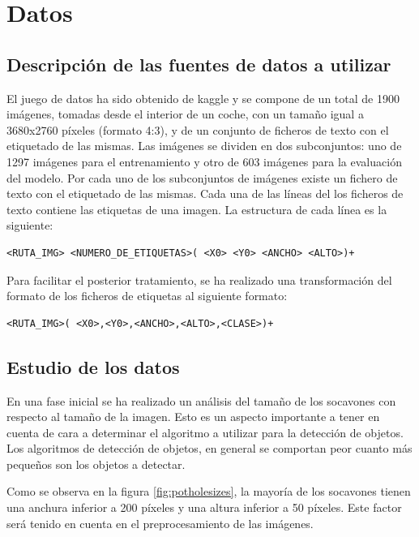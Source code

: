 \section{Datos}

\subsection{Descripción de las fuentes de datos a utilizar}

El juego de datos ha sido obtenido de kaggle \cite{potholedataset} y se compone de un total de 1900 imágenes, tomadas desde el interior de un coche, con un tamaño igual a 3680x2760 píxeles (formato 4:3), y de un conjunto de ficheros de texto con el etiquetado de las mismas. Las imágenes se dividen en dos subconjuntos: uno de 1297 imágenes para el entrenamiento y otro de 603 imágenes para la evaluación del modelo. Por cada uno de los subconjuntos de imágenes existe un fichero de texto con el etiquetado de las mismas. Cada una de las líneas del los ficheros de texto contiene las etiquetas de una imagen. La estructura de cada línea es la siguiente:

\begin{lstlisting}[frame=single,basicstyle=\ttfamily\footnotesize]
<RUTA_IMG> <NUMERO_DE_ETIQUETAS>( <X0> <Y0> <ANCHO> <ALTO>)+
\end{lstlisting}

Para facilitar el posterior tratamiento, se ha realizado una transformación del formato de los ficheros de etiquetas al siguiente formato:

\begin{lstlisting}[frame=single,basicstyle=\ttfamily\footnotesize]
<RUTA_IMG>( <X0>,<Y0>,<ANCHO>,<ALTO>,<CLASE>)+
\end{lstlisting}

\subsection{Estudio de los datos}

En una fase inicial se ha realizado un análisis del tamaño de los socavones con respecto al tamaño de la imagen. Esto es un aspecto importante a tener en cuenta de cara a determinar el algoritmo a utilizar para la detección de objetos. Los algoritmos de detección de objetos, en general se comportan peor cuanto más pequeños son los objetos a detectar.

Como se observa en la figura \ref{fig:potholesizes}, la mayoría de los socavones tienen una anchura inferior a 200 píxeles y una altura inferior a 50 píxeles. Este factor será tenido en cuenta en el preprocesamiento de las imágenes.

